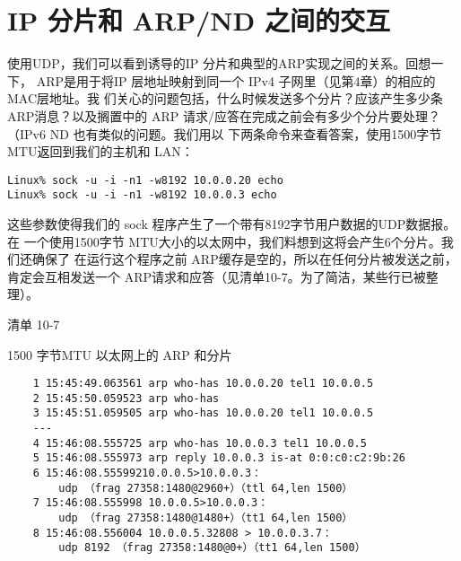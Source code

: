 \iffalse
\begin{tcolorbox}
\href{https://www.rfc-editor.org/rfc/rfc1191}{[RFC1191]}推荐一个由PMTUD得到的PMTU 值在10分钟后过时。路
径MTU 发现有时会因为防火墙和网关过滤可能不加选择地丢弃ICMP 流量而
出现问题，这会损害 PMTU 发现算法。因为这点，从基于系统范畴或有更好保
证来看，可能要关闭PMTU发现。在Linux 中，文件/proc/sys/net/ipv4/ip\_no\_
Pmtu\_disc 可以置成1以关闭PMTU发现。在 Windows 中，可以编辑注册表入口
\verb|HKEY_LOCAL_MACHINE\System CurrentControl Set Services Topip Parameters
EnablePMTUDiscovery| 的值0。一个不使用ICMP 的、传统 PMTUD 的替代品已
经被开发出来\href{https://www.rfc-editor.org/rfc/rfc4821}{[RFC4821]}，我们将在第15 章介绍它。
\end{tcolorbox}
\fi

\section{IP 分片和 ARP/ND 之间的交互}

使用UDP，我们可以看到诱导的IP 分片和典型的ARP实现之间的关系。回想一下，
ARP是用于将IP 层地址映射到同一个 IPv4 子网里（见第4章）的相应的MAC层地址。我
们关心的问题包括，什么时候发送多个分片？应该产生多少条ARP消息？以及搁置中的
ARP 请求/应答在完成之前会有多少个分片要处理？（IPv6 ND 也有类似的问题。我们用以
下两条命令来查看答案，使用1500字节 MTU返回到我们的主机和 LAN：

\begin{verbatim}
Linux% sock -u -i -n1 -w8192 10.0.0.20 echo
Linux% sock -u -i -n1 -w8192 10.0.0.3 echo
\end{verbatim}

这些参数使得我们的 sock 程序产生了一个带有8192字节用户数据的UDP数据报。在
一个使用1500字节 MTU大小的以太网中，我们料想到这将会产生6个分片。我们还确保了
在运行这个程序之前 ARP缓存是空的，所以在任何分片被发送之前，肯定会互相发送一个
ARP请求和应答（见清单10-7。为了简洁，某些行已被整理）。

清单 10-7

1500 字节MTU 以太网上的 ARP 和分片

\begin{verbatim}
    1 15:45:49.063561 arp who-has 10.0.0.20 tel1 10.0.0.5
    2 15:45:50.059523 arp who-has
    3 15:45:51.059505 arp who-has 10.0.0.20 tel1 10.0.0.5
    ---
    4 15:46:08.555725 arp who-has 10.0.0.3 tel1 10.0.0.5
    5 15:46:08.555973 arp reply 10.0.0.3 is-at 0:0:c0:c2:9b:26
    6 15:46:08.55599210.0.0.5>10.0.0.3：
        udp （frag 27358:1480@2960+）（ttl 64,len 1500）
    7 15:46:08.555998 10.0.0.5>10.0.0.3：
        udp （frag 27358:1480@1480+）（tt1 64,len 1500）
    8 15:46:08.556004 10.0.0.5.32808 > 10.0.0.3.7：
        udp 8192 （frag 27358:1480@0+）（tt1 64,len 1500）
\end{verbatim}

